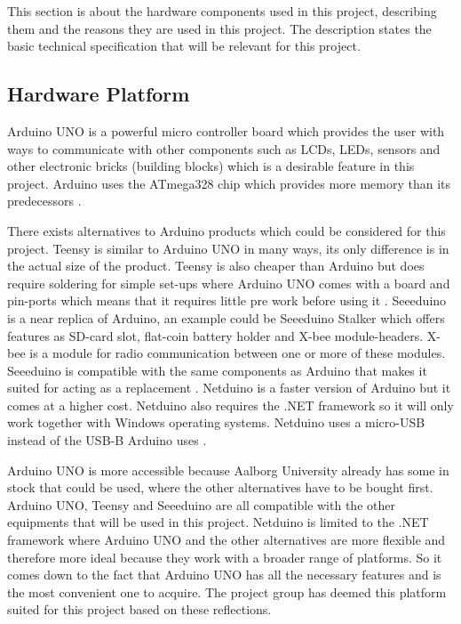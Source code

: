 \label{sec:Hardware}
This section is about the hardware components used in this project, describing them and the reasons they are used in this project. The description states the basic technical specification that will be relevant for this project.

\subsection{Hardware Platform}
\label{sec:hardwarearduino}
Arduino UNO is a powerful micro controller board which provides the user with ways to communicate with other components such as LCDs, LEDs, sensors and other electronic bricks (building blocks) which is a desirable feature in this project. Arduino uses the ATmega328 chip which provides more memory than its predecessors \citep{ArduinoUno}.

There exists alternatives to Arduino products which could be considered for this project. Teensy is similar to Arduino UNO in many ways, its only difference is in the actual size of the product. Teensy is also cheaper than Arduino but does require soldering for simple set-ups where Arduino UNO comes with a board and pin-ports which means that it requires little pre work before using it \citep{Teensy}.
Seeeduino is a near replica of Arduino, an example could be Seeeduino Stalker which offers features as SD-card slot, flat-coin battery holder and X-bee module-headers. X-bee is a module for radio communication between one or more of these modules. Seeeduino is compatible with the same components as 
Arduino that makes it suited for acting as a replacement \citep{Seedui}.
Netduino is a faster version of Arduino but it comes at a higher cost. Netduino also requires the .NET framework so it will only work together with Windows operating systems. Netduino uses a micro-USB instead of the USB-B Arduino uses \citep{Netdui}.

Arduino UNO is more accessible because Aalborg University already has some in stock that could be used, where the other alternatives have to be bought first. Arduino UNO, Teensy and Seeeduino are all compatible with the other equipments that will be used in this project. Netduino is limited to the .NET framework where Arduino UNO and the other alternatives are more flexible and therefore more ideal because they work with a broader range of platforms.
So it comes down to the fact that Arduino UNO has all the necessary features and is the most convenient one to acquire. The project group has deemed this platform suited for this project based on these reflections. 

